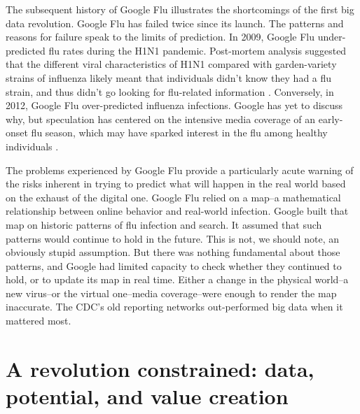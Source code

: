 \documentclass[12pt]{article}
\begin{document}
The subsequent history of Google Flu illustrates the shortcomings of
the first big data revolution. Google Flu has failed twice since its
launch. The patterns and reasons for failure speak to the limits of
prediction. In 2009, Google Flu under-predicted flu rates during the
H1N1 pandemic. Post-mortem analysis suggested that the different viral
characteristics of H1N1 compared with garden-variety strains of
influenza likely meant that individuals didn't know they had a flu
strain, and thus didn't go looking for flu-related information
\citep{cook2011assessing}. Conversely, in 2012, Google Flu
over-predicted influenza infections. Google has yet to discuss why,
but speculation has centered on the intensive media coverage of an
early-onset flu season, which may have sparked interest in the flu among
healthy individuals \citep{butler2013google}.

The problems experienced by Google Flu provide a particularly acute
warning of the risks inherent in trying to predict what will happen in
the real world based on the exhaust of the digital one. Google Flu
relied on a map--a mathematical relationship between online behavior
and real-world infection. Google built that map on historic patterns
of flu infection and search. It assumed that such patterns would
continue to hold in the future. This is not, we should note, an
obviously stupid assumption. But there was nothing fundamental
about those patterns, and Google had limited capacity to check whether
they continued to hold, or to update its map in real time. Either a change in
the physical world--a new virus--or the virtual one--media
coverage--were enough to render the map inaccurate. The CDC's old
reporting networks out-performed big data when it mattered most.



\section{A revolution constrained: data, potential, and value creation}
\label{sec:but-what-can}
\end{document}
